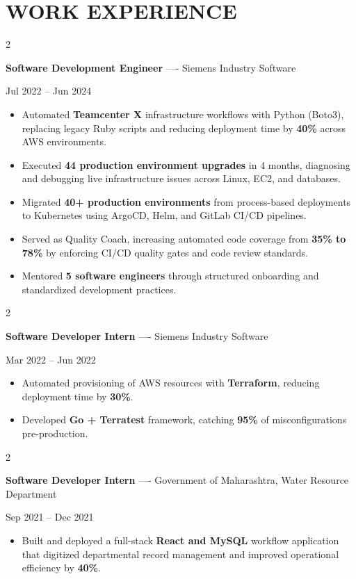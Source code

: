 \documentclass[10pt, letterpaper]{article}
\newenvironment{highlights}{
    \begin{itemize}[
        topsep=0.10 cm,
        parsep=0.06 cm,
        partopsep=0pt,
        itemsep=0.06 cm,
        leftmargin=12pt
    ]
}{
    \end{itemize}
}
\newenvironment{twocolentry}[2][]{
    \onecolentry
    \def\secondColumn{#2}
    \setcolumnwidth{\fill, 4.5 cm}
    \begin{paracol}{2}
}{
    \switchcolumn \raggedleft \secondColumn
    \end{paracol}
    \endonecolentry
}
\begin{document}
\section{WORK EXPERIENCE}
\begin{twocolentry}{Jul 2022 -- Jun 2024}
\textbf{Software Development Engineer} ---- Siemens Industry Software
\end{twocolentry}
\begin{highlights}
  \item Automated \textbf{Teamcenter X} infrastructure workflows with Python (Boto3), replacing legacy Ruby scripts and reducing deployment time by \textbf{40\%} across AWS environments.
  \item Executed \textbf{44 production environment upgrades} in 4 months, diagnosing and debugging live infrastructure issues across Linux, EC2, and databases.
  \item Migrated \textbf{40+ production environments} from process-based deployments to Kubernetes using ArgoCD, Helm, and GitLab CI/CD pipelines.
  \item Served as Quality Coach, increasing automated code coverage from \textbf{35\% to 78\%} by enforcing CI/CD quality gates and code review standards.
  \item Mentored \textbf{5 software engineers} through structured onboarding and standardized development practices.
\end{highlights}

\vspace{0.15 cm}

\begin{twocolentry}{Mar 2022 -- Jun 2022}
\textbf{Software Developer Intern} ---- Siemens Industry Software
\end{twocolentry}
\begin{highlights}
  \item Automated provisioning of AWS resources with \textbf{Terraform}, reducing deployment time by \textbf{30\%}.
  \item Developed \textbf{Go + Terratest} framework, catching \textbf{95\%} of misconfigurations pre-production.
\end{highlights}

\vspace{0.15 cm}

\begin{twocolentry}{Sep 2021 -- Dec 2021}
\textbf{Software Developer Intern} ---- Government of Maharashtra, Water Resource Department
\end{twocolentry}
\begin{highlights}
  \item Built and deployed a full-stack \textbf{React and MySQL} workflow application that digitized departmental record management and improved operational efficiency by \textbf{40\%}.
\end{highlights}
\end{document}
